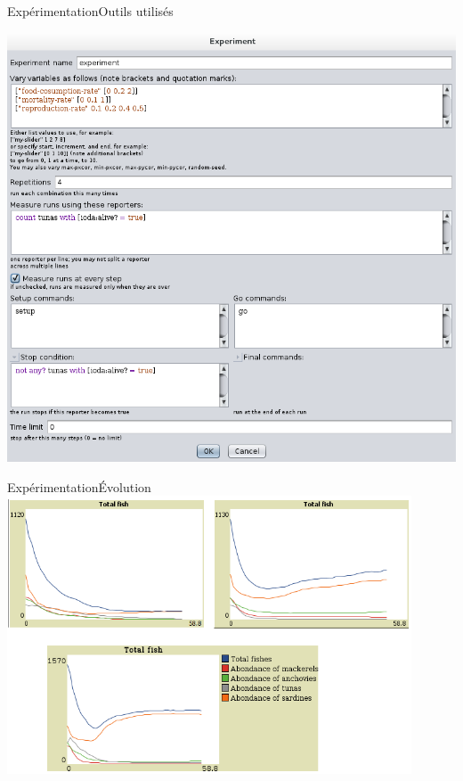 \documentclass[t, 10pt]{beamer}
\begin{document}
        \begin{frame}[c]{Expérimentation}{Outils utilisés}
          \begin{center}
            \includegraphics[height=0.8\textheight]{img/behaviorspace.png}
          \end{center}
        \end{frame}
        
        \begin{frame}{Expérimentation}{Évolution}
          \includegraphics[width=0.9\textwidth]{img/evolution.png}
        \end{frame}
        
\end{document}
